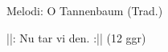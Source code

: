 \begin{song}

\begin{songmeta}
Melodi: O Tannenbaum (Trad.)
\end{songmeta}

\begin{songtext}
||: Nu tar vi den. :|| (12 ggr)
\end{songtext}

\end{song}
